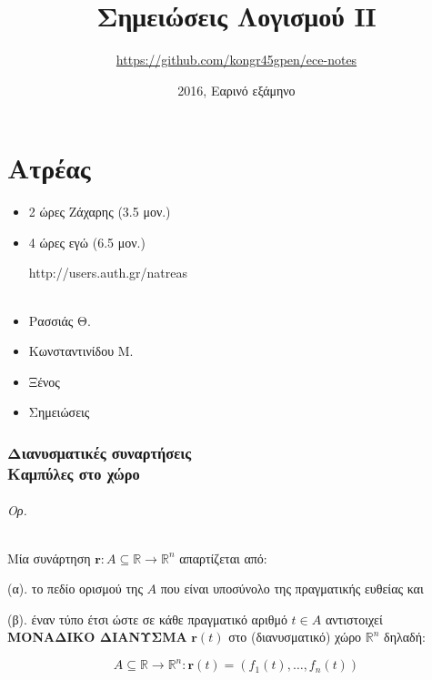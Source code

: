 \documentclass[11pt,a4paper,titlepage,draft]{article}
\title{Σημειώσεις Λογισμού ΙΙ}
\date{2016, Εαρινό εξάμηνο}
\author{\textlatin{\url{https://github.com/kongr45gpen/ece-notes}}}
\newcommand{\textlatin}[1]{#1}
\begin{document}
\maketitle

\tableofcontents

\newpage

\part{Ατρέας}

\setcounter{section}{-1}

\begin{itemize}
\item 2 ώρες Ζάχαρης (3.5 μον.)
\item 4 ώρες εγώ (6.5 μον.)

\textlatin{http://users.auth.gr/natreas}
\end{itemize}

\paragraph{}

\begin{itemize}
\item Ρασσιάς Θ.
\item Κωνσταντινίδου Μ.
\item Ξένος
\item Σημειώσεις
\end{itemize}

\section[Διανυσματικές συναρτήσεις \& καμπύλες στο χώρο]{Διανυσματικές συναρτήσεις \\ Καμπύλες στο χώρο}

\paragraph{Ορ.}
Μία συνάρτηση \( \mathbf{r}: A \subseteq \mathbb R \rightarrow \mathbb R ^ n \) απαρτίζεται από:

(α). το πεδίο ορισμού της \(A\) που είναι υποσύνολο της πραγματικής ευθείας και

(β). έναν τύπο έτσι ώστε σε κάθε πραγματικό αριθμό \(t \in A\) αντιστοιχεί \textbf{ΜΟΝΑΔΙΚΟ ΔΙΑΝΥΣΜΑ} \( \mathbf{r}(t) \) στο (διανυσματικό) χώρο \( \mathbb R ^ n \) δηλαδή:

\[
A \subseteq \mathbb R \rightarrow \mathbb R ^ n: \mathbf{r}(t) = \left( f_1(t), \dots, f_n(t) \right)
\]
\end{document}
